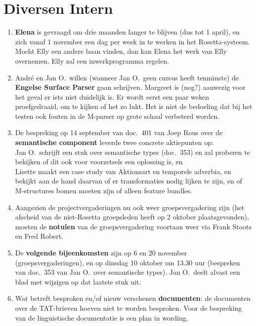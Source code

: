 \section{Diversen Intern}
\begin{enumerate}
  \item {\bf Elena} is gevraagd om drie maanden langer te blijven (dus tot 1 
april), en zich vanaf 1 november een dag per week in te werken in het 
Rosetta-systeem. Mocht Elly een andere baan vinden, dan kan Elena het werk van 
Elly overnemen. Elly zal een inwerkprogramma regelen.
  \item Andr\'{e} en Jan O.\ willen (wanneer Jan O.\ geen cursus heeft 
tenminste) de {\bf Engelse Surface Parser} gaan schrijven. Margreet is 
(nog?) aanwezig voor het geval er iets niet duidelijk is. Er wordt eerst een 
paar weken proefgedraaid, om te kijken of het zo lukt. Het is niet de bedoeling 
dat bij het testen ook fouten in de M-parser op grote schaal verbeterd worden.
  \item De bespreking op 14 september van doc.\ 401 van Joep Rous over de 
{\bf semanti\-sche 
component} leverde twee concrete aktiepunten op: \\
Jan O.\ schrijft een stuk over semantische types (doc.\ 353) en zal proberen te 
bekijken of dit ook voor voorzetsels een oplossing is, en\\
Lisette maakt een case study van Aktionsart en temporele adverbia, en bekijkt 
aan de hand daarvan of er transformaties nodig lijken te zijn, en of
M-structures bomen moeten zijn of alleen feature bundles.
  \item Aangezien de projectvergaderingen nu ook weer groepsvergadering zijn
(het afscheid van de niet-Rosetta groepsleden heeft op 2 oktober 
plaatsgevonden), moeten de {\bf notulen} van de groepsvergadering voortaan weer 
via Frank Stoots en Fred Robert.
  \item De {\bf volgende bijeenkomsten} zijn op 6 en 20 november 
(groepsvergaderingen), en op dinsdag 10 oktober om 13.30 uur (bespreken van 
doc.\ 353 van Jan O.\ over semantische types). Jan O.\ deelt alvast een blad 
met wijzigen op dat laatste stuk uit.
  \item Wat betreft besproken en/of nieuw verschenen {\bf documenten}: de
documenten over de TAT-brieven hoeven niet te worden besproken.
Voor de bespreking van de linguistische documentatie is een plan in wording.
\end{enumerate}


